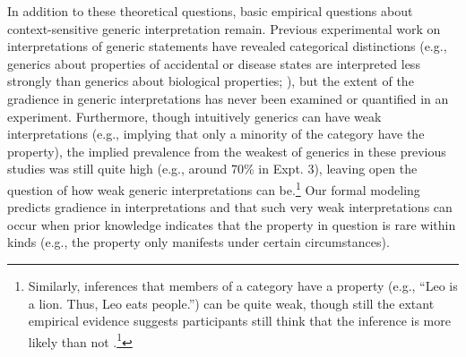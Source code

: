 \documentclass[floatsintext,doc]{apa6}
\let\rmarkdownfootnote\footnote%
\def\footnote{\protect\rmarkdownfootnote}
\newcommand{\mht}[1]{{\textcolor{Blue}{[mht: #1]}}}
\begin{document}



In addition to these theoretical questions, basic empirical questions about context-sensitive generic interpretation remain.
Previous experimental work on interpretations of generic statements have revealed categorical distinctions (e.g., generics about properties of accidental or disease states are interpreted less strongly than generics about biological properties; ), but the extent of the gradience in generic interpretations has never been examined or quantified in an experiment. 
Furthermore, though intuitively generics can have weak interpretations (e.g., implying that only a minority of the category have the property), the implied prevalence from the weakest of generics in these previous studies was still quite high (e.g., around 70\% in  Expt. 3), leaving open the question of how weak generic interpretations can be.\footnote{Similarly, inferences that members of a category have a property (e.g., \enquote{Leo is a lion. Thus, Leo eats people.}) can be quite weak, though still the extant empirical evidence suggests participants still think that the inference is more likely than not \cite{Khemlani2012}.\footnote{In this study of , the measurement was actually a confidence rating on -3 to +3 scale. All reported mean confidence ratings were greater than the midpoint of the scale.}
}
Our formal modeling predicts gradience in interpretations and that such very weak interpretations can occur when prior knowledge indicates that the property in question is rare within kinds (e.g., the property only manifests under certain circumstances).
\end{document}

